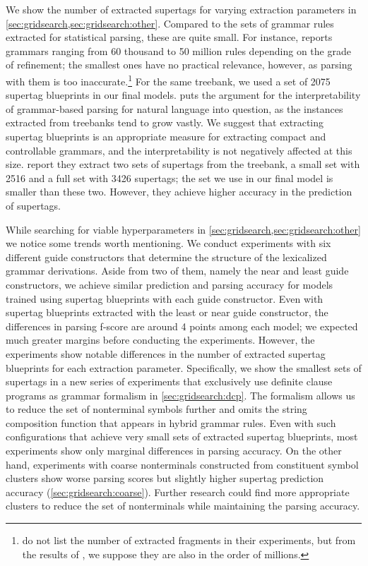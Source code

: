 \documentclass[../document.tex]{subfiles}
\begin{document}
    We show the number of extracted supertags for varying extraction parameters in \cref{sec:gridsearch,sec:gridsearch:other}.
    Compared to the sets of grammar rules extracted for statistical parsing, these are quite small.
    For instance, \citet[in Figure~7.4]{Geb20} reports grammars ranging from 60 thousand to 50 million rules depending on the grade of refinement; the smallest ones have no practical relevance, however, as parsing with them is too inaccurate.\footnote{
         do not list the number of extracted fragments in their experiments, but from the results of \citet{San11}, we suppose they are also in the order of millions.
    }
    For the same treebank, we used a set of 2075 supertag blueprints in our final models.
     puts the argument for the interpretability of grammar-based parsing for natural language into question, as the instances extracted from treebanks tend to grow vastly.
    We suggest that extracting supertag blueprints is an appropriate measure for extracting compact and controllable grammars, and the interpretability is not negatively affected at this size.
     report they extract two sets of  supertags from the treebank, a small set with 2516 and a full set with 3426 supertags; the set we use in our final model is smaller than these two.
    However, they achieve higher accuracy in the prediction of supertags.

    While searching for viable hyperparameters in \cref{sec:gridsearch,sec:gridsearch:other} we notice some trends worth mentioning.
    We conduct experiments with six different guide constructors that determine the structure of the lexicalized grammar derivations.
    Aside from two of them, namely the near and least guide constructors, we achieve similar prediction and parsing accuracy for models trained using supertag blueprints with each guide constructor.
    Even with supertag blueprints extracted with the least or near guide constructor, the differences in parsing f-score are around 4 points among each model; we expected much greater margins before conducting the experiments.
    However, the experiments show notable differences in the number of extracted supertag blueprints for each extraction parameter.
    Specifically, we show the smallest sets of supertags in a new series of experiments that exclusively use definite clause programs as grammar formalism in \cref{sec:gridsearch:dcp}.
    The formalism allows us to reduce the set of nonterminal symbols further and omits the string composition function that appears in hybrid grammar rules.
    Even with such configurations that achieve very small sets of extracted supertag blueprints, most experiments show only marginal differences in parsing accuracy.
    On the other hand, experiments with coarse nonterminals constructed from constituent symbol clusters show worse parsing scores but slightly higher supertag prediction accuracy (\cref{sec:gridsearch:coarse}).
    Further research could find more appropriate clusters to reduce the set of nonterminals while maintaining the parsing accuracy.
\end{document}
